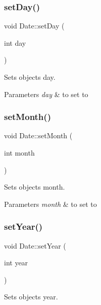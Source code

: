 \subsubsection{\texorpdfstring{set\+Day()}{setDay()}}
{\footnotesize\ttfamily void Date\+::set\+Day (\begin{DoxyParamCaption}\item[{int}]{day }\end{DoxyParamCaption})}



Sets object\textquotesingle{}s day. 


\begin{DoxyParams}{Parameters}
{\em day} & to set to \\
\hline
\end{DoxyParams}
\mbox{\label{group___date_ga23aa56014dd581d691607df5d4474f64}} 
\subsubsection{\texorpdfstring{set\+Month()}{setMonth()}}
{\footnotesize\ttfamily void Date\+::set\+Month (\begin{DoxyParamCaption}\item[{int}]{month }\end{DoxyParamCaption})}



Sets object\textquotesingle{}s month. 


\begin{DoxyParams}{Parameters}
{\em month} & to set to \\
\hline
\end{DoxyParams}
\mbox{\label{group___date_ga895c4ae9868e43577cf59d9c679d7a71}} 
\subsubsection{\texorpdfstring{set\+Year()}{setYear()}}
{\footnotesize\ttfamily void Date\+::set\+Year (\begin{DoxyParamCaption}\item[{int}]{year }\end{DoxyParamCaption})}



Sets object\textquotesingle{}s year. 


